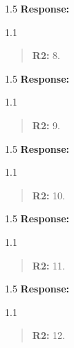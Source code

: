 \documentclass[12pt,english]{article}
\newcommand{\rrquote}{1.1}
\newcommand{\rrxspc}{1.5}
\begin{document}
\begin{refsection}
        \begin{spacing}{\rrxspc}
           \textbf{Response:}  
    \end{spacing}

    \begin{spacing}{\rrquote}
        \begin{quotation}
        \textbf{R2: } 8. 
        \end{quotation}
        \end{spacing}
        
        \begin{spacing}{\rrxspc}
           \textbf{Response:}  
    \end{spacing}

    \begin{spacing}{\rrquote}
        \begin{quotation}
        \textbf{R2: } 9. 
        \end{quotation}
        \end{spacing}
        
        \begin{spacing}{\rrxspc}
           \textbf{Response:}  
    \end{spacing}

    \begin{spacing}{\rrquote}
        \begin{quotation}
        \textbf{R2: } 10. 
        \end{quotation}
        \end{spacing}
        
        \begin{spacing}{\rrxspc}
           \textbf{Response:}  
    \end{spacing}

    \begin{spacing}{\rrquote}
        \begin{quotation}
        \textbf{R2: } 11. 
        \end{quotation}
        \end{spacing}
        
        \begin{spacing}{\rrxspc}
           \textbf{Response:}  
    \end{spacing}

    \begin{spacing}{\rrquote}
        \begin{quotation}
        \textbf{R2: } 12. 
        \end{quotation}
        \end{spacing}
        

\end{refsection}
\end{document}
